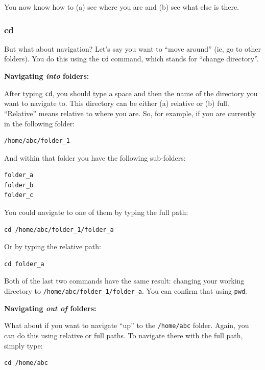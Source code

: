 \documentclass[
]{book}
\begin{document}
You now know how to (a) see where you are and (b) see what else is there.

\hypertarget{cd}{%
\subsubsection*{cd}\label{cd}}

But what about navigation? Let's say you want to ``move around'' (ie, go to other folders). You do this using the \texttt{cd} command, which stands for ``change directory''.

\textbf{Navigating \emph{into} folders:}

After typing \texttt{cd}, you should type a space and then the name of the directory you want to navigate to. This directory can be either (a) relative or (b) full. ``Relative'' means relative to where you are. So, for example, if you are currently in the following folder:

\begin{verbatim}
/home/abc/folder_1
\end{verbatim}

And within that folder you have the following sub-folders:

\begin{verbatim}
folder_a
folder_b
folder_c
\end{verbatim}

You could navigate to one of them by typing the full path:

\begin{verbatim}
cd /home/abc/folder_1/folder_a
\end{verbatim}

Or by typing the relative path:

\begin{verbatim}
cd folder_a
\end{verbatim}

Both of the last two commands have the same result: changing your working directory to \texttt{/home/abc/folder\_1/folder\_a}. You can confirm that using \texttt{pwd}.

\textbf{Navigating \emph{out of} folders:}

What about if you want to navigate ``up'' to the \texttt{/home/abc} folder. Again, you can do this using relative or full paths. To navigate there with the full path, simply type:

\begin{verbatim}
cd /home/abc
\end{verbatim}
\end{document}
